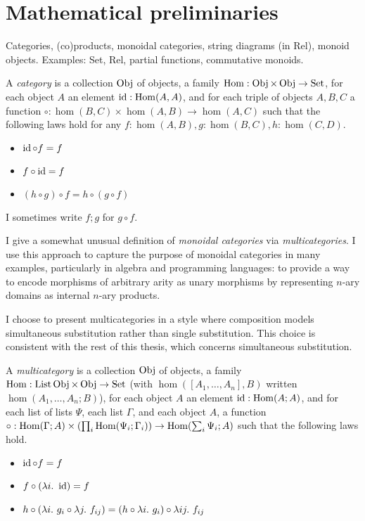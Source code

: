 \chapter{Mathematical preliminaries}

Categories, (co)products, monoidal categories, string diagrams (in Rel),
monoid objects.
Examples: Set, Rel, partial functions, commutative monoids.

\begin{definition}
  A \emph{category} is a collection $\operatorname{Obj}$ of objects, a family
  $\operatorname{Hom} : \operatorname{Obj} \times \operatorname{Obj} \to \operatorname{Set}$, for each object $A$ an element
  $\operatorname{id} : \operatorname{Hom}(A,A)$, and for each triple of objects $A, B, C$ a function
  ${\circ} : \hom(B,C) \times \hom(A,B) \to \hom(A,C)$ such that the following
  laws hold for any $f : \hom(A,B), g : \hom(B,C), h : \hom(C,D)$.
  \begin{itemize}
    \item $\operatorname{id} \circ f = f$
    \item $f \circ \operatorname{id} = f$
    \item $(h \circ g) \circ f = h \circ (g \circ f)$
  \end{itemize}
  I sometimes write $f; g$ for $g \circ f$.
\end{definition}

I give a somewhat unusual definition of \emph{monoidal categories} via
\emph{multicategories}.
I use this approach to capture the purpose of monoidal categories in many
examples, particularly in algebra and programming languages: to provide a way to
encode morphisms of arbitrary arity as unary morphisms by representing $n$-ary
domains as internal $n$-ary products.

I choose to present multicategories in a style where composition models
simultaneous substitution rather than single substitution.
This choice is consistent with the rest of this thesis, which concerns
simultaneous substitution.

\begin{definition}
  A \emph{multicategory} is a collection $\operatorname{Obj}$ of objects, a family
  $\operatorname{Hom} : \operatorname{List} \operatorname{Obj} \times \operatorname{Obj} \to \operatorname{Set}$ (with $\hom([A_1, \ldots, A_n], B)$
  written $\hom(A_1, \ldots, A_n; B)$), for each object $A$ an element
  $\operatorname{id} : \operatorname{Hom}(A; A)$, and for each list of lists $\Psi$, each list $\Gamma$, and
  each object $A$, a function
  ${\circ} : \hom(\Gamma; A) \times \plr{\prod_i \hom(\Psi_i; \Gamma_i)} \to
  \hom\plr{\sum_i \Psi_i; A}$ such that the following laws hold.
  \begin{itemize}
    \item $\operatorname{id} \circ f = f$
    \item $f \circ \plr{\lambda i.~\id} = f$
    \item $h \circ \plr{\lambda i.~g_i \circ \lambda j.~f_{ij}} =
      (h \circ \lambda i.~g_i) \circ \lambda ij.~f_{ij}$
  \end{itemize}
\end{definition}

